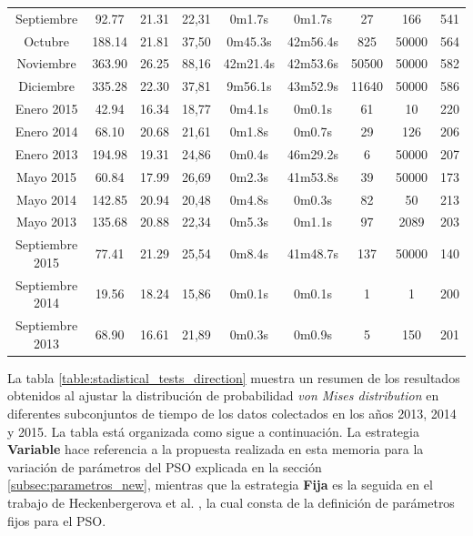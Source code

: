 \begin{table}[ht!]
{\begin{tabular}{|c|c|c|c|c|c|c|c|c|}
        Septiembre      & 92.77     & 21.31     & 22,31     & 0m1.7s      & 0m1.7s      & 27    & 166   & 541 \\
        Octubre         & 188.14    & 21.81     & 37,50     & 0m45.3s     & 42m56.4s    & 825   & 50000 & 564 \\
        Noviembre       & 363.90    & 26.25     & 88,16     & 42m21.4s    & 42m53.6s    & 50500 & 50000 & 582 \\
        Diciembre       & 335.28    & 22.30     & 37,81     & 9m56.1s     & 43m52.9s    & 11640 & 50000 & 586 \\
        \hline 
        Enero 2015      & 42.94     & 16.34     & 18,77     & 0m4.1s      & 0m0.1s      & 61    & 10    & 220 \\
        Enero 2014      & 68.10     & 20.68     & 21,61     & 0m1.8s      & 0m0.7s      & 29    & 126   & 206 \\
        Enero 2013      & 194.98    & 19.31     & 24,86     & 0m0.4s      & 46m29.2s    & 6     & 50000 & 207 \\
        Mayo 2015       & 60.84     & 17.99     & 26,69     & 0m2.3s      & 41m53.8s    & 39    & 50000 & 173 \\
        Mayo 2014       & 142.85    & 20.94     & 20,48     & 0m4.8s      & 0m0.3s      & 82    & 50    & 213 \\
        Mayo 2013       & 135.68    & 20.88     & 22,34     & 0m5.3s      & 0m1.1s      & 97    & 2089  & 203 \\
        Septiembre 2015 & 77.41     & 21.29     & 25,54     & 0m8.4s      & 41m48.7s    & 137   & 50000 & 140 \\
        Septiembre 2014 & 19.56     & 18.24     & 15,86     & 0m0.1s      & 0m0.1s      & 1     & 1     & 200 \\
        Septiembre 2013 & 68.90     & 16.61     & 21,89     & 0m0.3s      & 0m0.9s      & 5     & 150   & 201 \\
        \hline  
    \end{tabular}
    }   
\end{table}
La tabla \ref{table:stadistical_tests_direction} muestra un resumen de los resultados obtenidos al ajustar la distribución de probabilidad \emph{von Mises distribution} en diferentes subconjuntos de tiempo de los datos colectados en los años 2013, 2014 y 2015. La tabla está organizada como sigue a continuación. La estrategia \textbf{Variable} hace referencia a la propuesta realizada en esta memoria para la variación de parámetros del PSO explicada en la sección \ref{subsec:parametros_new}, mientras que la estrategia \textbf{Fija} es la seguida en el trabajo de Heckenbergerova et al. \cite{Heckenbergerova15}, la cual consta de la definición de parámetros fijos para el PSO.
